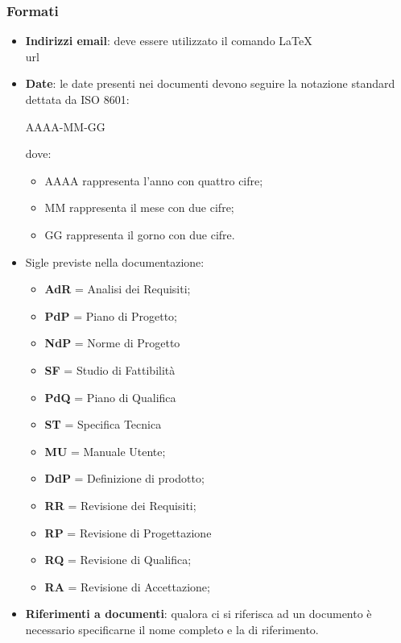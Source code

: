 \subsubsection{Formati}
\begin{itemize}
\item \textbf{Indirizzi email}: deve essere utilizzato il comando \LaTeX \\url
\item \textbf{Date}: le date presenti nei documenti devono seguire la notazione standard dettata da ISO 8601:

  \begin{center}
    AAAA-MM-GG
  \end{center}
  
  dove:
  \begin{itemize}
  \item AAAA rappresenta l'anno con quattro cifre;
  \item MM rappresenta il mese con due cifre;
  \item GG rappresenta il gorno con due cifre.
  \end{itemize}
\item Sigle previste nella documentazione:
  \begin{itemize}
  \item \textbf{AdR} = Analisi dei Requisiti;
  \item \textbf{PdP} = Piano di Progetto;
  \item \textbf{NdP} = Norme di Progetto
  \item \textbf{SF} = Studio di Fattibilità
  \item \textbf{PdQ} = Piano di Qualifica
  \item \textbf{ST} = Specifica Tecnica
  \item \textbf{MU} = Manuale Utente;
  \item \textbf{DdP} = Definizione di prodotto;
  \item \textbf{RR} = Revisione dei Requisiti;
  \item \textbf{RP} = Revisione di Progettazione
  \item \textbf{RQ} = Revisione di Qualifica;
  \item \textbf{RA} = Revisione di Accettazione;
  \end{itemize}
\item \textbf{Riferimenti a documenti}: qualora ci si riferisca ad un documento è necessario specificarne il nome completo e la  di riferimento.
\end{itemize}

